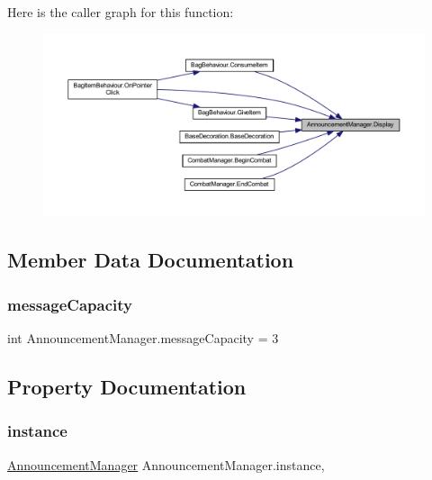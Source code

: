 Here is the caller graph for this function\+:
\nopagebreak
\begin{figure}[H]
\begin{center}
\leavevmode
\includegraphics[width=350pt]{class_announcement_manager_a931bdfbc829e1165fdbd7a3a848e95d1_icgraph}
\end{center}
\end{figure}


\subsection{Member Data Documentation}
\mbox{\label{class_announcement_manager_aa23d155cc088be3437ef92cc337c0492}} 
\subsubsection{\texorpdfstring{messageCapacity}{messageCapacity}}
{\footnotesize\ttfamily int Announcement\+Manager.\+message\+Capacity = 3\hspace{0.3cm}{\ttfamily [static]}}



\subsection{Property Documentation}
\mbox{\label{class_announcement_manager_a23f0a77f19174bf82815db8a2c3f4c94}} 
\subsubsection{\texorpdfstring{instance}{instance}}
{\footnotesize\ttfamily \mbox{\hyperlink{class_announcement_manager}{Announcement\+Manager}} Announcement\+Manager.\+instance\hspace{0.3cm}{\ttfamily [static]}, {\ttfamily [get]}}

